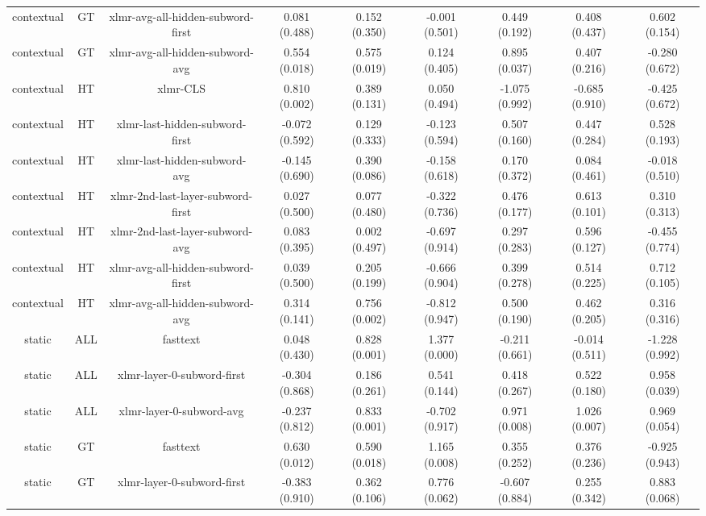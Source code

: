 \begin{sidewaystable}[htb]
\begin{tabular}{@{}ccccccccc@{}}
        contextual & GT & xlmr-avg-all-hidden-subword-first & 0.081 (0.488) & 0.152 (0.350) & -0.001 (0.501) & 0.449 (0.192) & 0.408 (0.437) & 0.602 (0.154) \\
        contextual & GT & xlmr-avg-all-hidden-subword-avg & 0.554 (0.018) & 0.575 (0.019) & 0.124 (0.405) & 0.895 (0.037) & 0.407 (0.216) & -0.280 (0.672) \\
        contextual & HT & xlmr-CLS & 0.810 (0.002) & 0.389 (0.131) & 0.050 (0.494) & -1.075 (0.992) & -0.685 (0.910) & -0.425 (0.672) \\
        contextual & HT & xlmr-last-hidden-subword-first & -0.072 (0.592) & 0.129 (0.333) & -0.123 (0.594) & 0.507 (0.160) & 0.447 (0.284) & 0.528 (0.193) \\
        contextual & HT & xlmr-last-hidden-subword-avg & -0.145 (0.690) & 0.390 (0.086) & -0.158 (0.618) & 0.170 (0.372) & 0.084 (0.461) & -0.018 (0.510) \\
        contextual & HT & xlmr-2nd-last-layer-subword-first & 0.027 (0.500) & 0.077 (0.480) & -0.322 (0.736) & 0.476 (0.177) & 0.613 (0.101) & 0.310 (0.313) \\
        contextual & HT & xlmr-2nd-last-layer-subword-avg & 0.083 (0.395) & 0.002 (0.497) & -0.697 (0.914) & 0.297 (0.283) & 0.596 (0.127) & -0.455 (0.774) \\
        contextual & HT & xlmr-avg-all-hidden-subword-first & 0.039 (0.500) & 0.205 (0.199) & -0.666 (0.904) & 0.399 (0.278) & 0.514 (0.225) & 0.712 (0.105) \\
        contextual & HT & xlmr-avg-all-hidden-subword-avg & 0.314 (0.141) & 0.756 (0.002) & -0.812 (0.947) & 0.500 (0.190) & 0.462 (0.205) & 0.316 (0.316) \\
        static & ALL & fasttext & 0.048 (0.430) & 0.828 (0.001) & 1.377 (0.000) & -0.211 (0.661) & -0.014 (0.511) & -1.228 (0.992) \\
        static & ALL & xlmr-layer-0-subword-first & -0.304 (0.868) & 0.186 (0.261) & 0.541 (0.144) & 0.418 (0.267) & 0.522 (0.180) & 0.958 (0.039) \\
        static & ALL & xlmr-layer-0-subword-avg & -0.237 (0.812) & 0.833 (0.001) & -0.702 (0.917) & 0.971 (0.008) & 1.026 (0.007) & 0.969 (0.054) \\
        static & GT & fasttext & 0.630 (0.012) & 0.590 (0.018) & 1.165 (0.008) & 0.355 (0.252) & 0.376 (0.236) & -0.925 (0.943) \\
        static & GT & xlmr-layer-0-subword-first & -0.383 (0.910) & 0.362 (0.106) & 0.776 (0.062) & -0.607 (0.884) & 0.255 (0.342) & 0.883 (0.068) \\

\end{tabular}
\end{sidewaystable}
